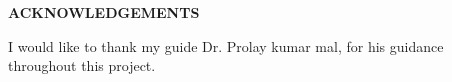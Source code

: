 \begin{center}
{\bf ACKNOWLEDGEMENTS}
\end{center}
I would like to thank my  guide Dr. Prolay kumar mal, for his guidance throughout this project.
